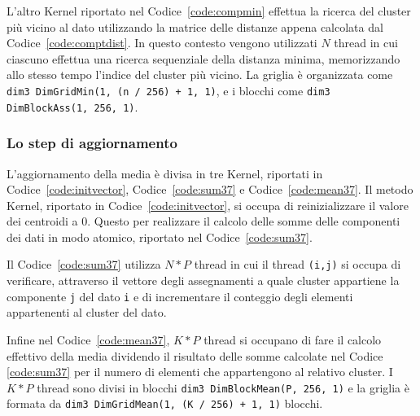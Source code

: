 \documentclass[10pt,twocolumn,letterpaper]{article}
\begin{document}

L'altro Kernel riportato nel Codice~\ref{code:compmin} effettua la ricerca del cluster più vicino al dato utilizzando la matrice delle distanze appena calcolata dal Codice~\ref{code:comptdist}. In questo contesto vengono utilizzati $N$ thread in cui ciascuno effettua una ricerca sequenziale della distanza minima, memorizzando allo stesso tempo l'indice del cluster più vicino. La griglia è organizzata come \texttt{dim3 DimGridMin(1, (n / 256) + 1, 1)}, e i blocchi come \texttt{dim3 DimBlockAss(1, 256, 1)}.\par




\subsubsection*{Lo step di aggiornamento}

L'aggiornamento della media è divisa in tre Kernel, riportati in Codice~\ref{code:initvector}, Codice~\ref{code:sum37} e Codice~\ref{code:mean37}.
Il metodo Kernel, riportato in Codice~\ref{code:initvector}, si occupa di reinizializzare il valore dei centroidi a 0. Questo per realizzare il calcolo delle somme delle componenti dei dati in modo atomico, riportato nel Codice~\ref{code:sum37}. 


Il Codice~\ref{code:sum37} utilizza $N*P$ thread in cui il thread \texttt{(i,j)} si occupa di verificare, attraverso il vettore degli assegnamenti a quale cluster appartiene la componente \texttt{j} del dato \texttt{i} e di incrementare il conteggio degli elementi appartenenti al cluster del dato.



Infine nel Codice~\ref{code:mean37}, $K*P$ thread si occupano di fare il calcolo effettivo della media dividendo il risultato delle somme calcolate nel Codice \ref{code:sum37} per il numero di elementi che appartengono al relativo cluster. I $K*P$ thread sono divisi in blocchi \texttt{dim3 DimBlockMean(P, 256, 1)} e la griglia è formata da \texttt{dim3 DimGridMean(1, (K / 256) + 1, 1)} blocchi.

\end{document}
